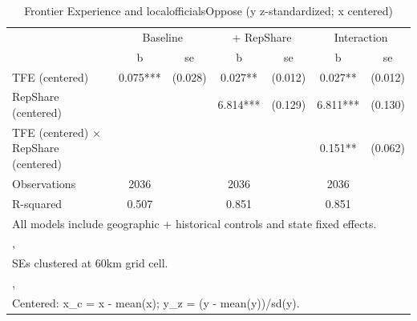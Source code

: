 \begin{table}[htbp]\centering
\def\sym#1{\ifmmode^{#1}\else\(^{#1}\)\fi}
\caption{Frontier Experience and localofficialsOppose (y z-standardized; x centered)}
\begin{tabular}{l*{3}{cc}}
\toprule
                &\multicolumn{2}{c}{Baseline}&\multicolumn{2}{c}{ + RepShare}&\multicolumn{2}{c}{Interaction}\\
                &        b   &       se&        b   &       se&        b   &       se\\
\midrule
TFE (centered)  &    0.075***&  (0.028)&    0.027** &  (0.012)&    0.027** &  (0.012)\\
RepShare (centered)&            &         &    6.814***&  (0.129)&    6.811***&  (0.130)\\
TFE (centered) $\times$ RepShare (centered)&            &         &            &         &    0.151** &  (0.062)\\
\midrule
Observations    &     2036   &         &     2036   &         &     2036   &         \\
R-squared       &    0.507   &         &    0.851   &         &    0.851   &         \\
\bottomrule
\multicolumn{7}{l}{\footnotesize All models include geographic + historical controls and state fixed effects.}\\
\multicolumn{7}{l}{\footnotesize ,}\\
\multicolumn{7}{l}{\footnotesize SEs clustered at 60km grid cell.}\\
\multicolumn{7}{l}{\footnotesize ,}\\
\multicolumn{7}{l}{\footnotesize Centered: x\_c = x - mean(x); y\_z = (y - mean(y))/sd(y).}\\
\end{tabular}
\end{table}
